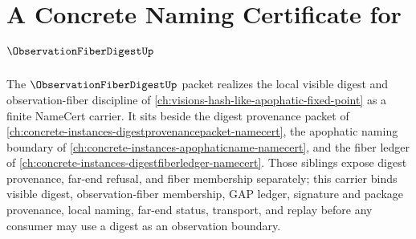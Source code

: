 \chapter{A Concrete Naming Certificate for $\ObservationFiberDigestUp$}
\label{ch:concrete-instances-observation-fiber-digest-namecert}

The $\ObservationFiberDigestUp$ packet realizes the local visible digest and observation-fiber discipline of \autoref{ch:visions-hash-like-apophatic-fixed-point} as a finite NameCert carrier. It sits beside the digest provenance packet of \autoref{ch:concrete-instances-digestprovenancepacket-namecert}, the apophatic naming boundary of \autoref{ch:concrete-instances-apophaticname-namecert}, and the fiber ledger of \autoref{ch:concrete-instances-digestfiberledger-namecert}. Those siblings expose digest provenance, far-end refusal, and fiber membership separately; this carrier binds visible digest, observation-fiber membership, GAP ledger, signature and package provenance, local naming, far-end status, transport, and replay before any consumer may use a digest as an observation boundary.



